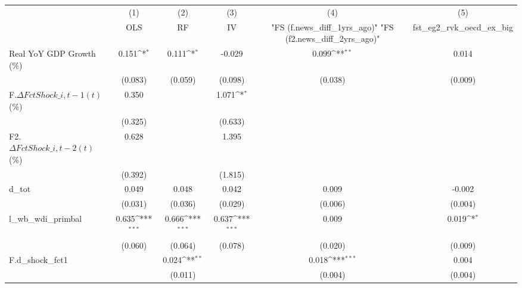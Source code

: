 {
\def\sym#1{\ifmmode^{#1}\else\(^{#1}\)\fi}
\begin{tabular}{l*{5}{c}}
\toprule
                    &\multicolumn{1}{c}{(1)}&\multicolumn{1}{c}{(2)}&\multicolumn{1}{c}{(3)}&\multicolumn{1}{c}{(4)}&\multicolumn{1}{c}{(5)}\\
                    &\multicolumn{1}{c}{OLS}&\multicolumn{1}{c}{RF}&\multicolumn{1}{c}{IV}&\multicolumn{1}{c}{ "FS (f.news\_diff\_1yrs\_ago)"  "FS (f2.news\_diff\_2yrs\_ago)" }&\multicolumn{1}{c}{fst\_eg2\_rvk\_oecd\_ex\_big}\\
\midrule
Real YoY GDP Growth (\%)&       0.151\sym{*}  &       0.111\sym{*}  &      -0.029         &       0.099\sym{**} &       0.014         \\
                    &     (0.083)         &     (0.059)         &     (0.098)         &     (0.038)         &     (0.009)         \\
\addlinespace
F.$\Delta FctShock\_{i,t-1}(t)$ (\%)&       0.350         &                     &       1.071\sym{*}  &                     &                     \\
                    &     (0.325)         &                     &     (0.633)         &                     &                     \\
\addlinespace
F2.$\Delta FctShock\_{i,t-2}(t)$ (\%)&       0.628         &                     &       1.395         &                     &                     \\
                    &     (0.392)         &                     &     (1.815)         &                     &                     \\
\addlinespace
d\_tot               &       0.049         &       0.048         &       0.042         &       0.009         &      -0.002         \\
                    &     (0.031)         &     (0.036)         &     (0.029)         &     (0.006)         &     (0.004)         \\
\addlinespace
l\_wb\_wdi\_primbal    &       0.635\sym{***}&       0.666\sym{***}&       0.637\sym{***}&       0.009         &       0.019\sym{*}  \\
                    &     (0.060)         &     (0.064)         &     (0.078)         &     (0.020)         &     (0.009)         \\
\addlinespace
F.d\_shock\_fct1      &                     &       0.024\sym{**} &                     &       0.018\sym{***}&       0.004         \\
                    &                     &     (0.011)         &                     &     (0.004)         &     (0.004)         \\

\end{tabular}}
